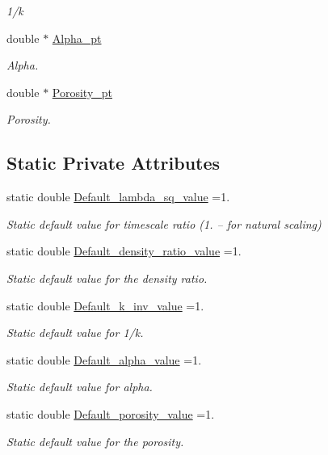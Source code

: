 \begin{DoxyCompactItemize}
\begin{DoxyCompactList}\small\item\em 1/k \end{DoxyCompactList}\item 
double $\ast$ \hyperlink{classoomph_1_1PoroelasticityEquations_a54c041adaebdbbf30e16becf2540edbe}{Alpha\+\_\+pt}
\begin{DoxyCompactList}\small\item\em Alpha. \end{DoxyCompactList}\item 
double $\ast$ \hyperlink{classoomph_1_1PoroelasticityEquations_a247e7383f1a5e52750c6c66ca15f45ce}{Porosity\+\_\+pt}
\begin{DoxyCompactList}\small\item\em Porosity. \end{DoxyCompactList}\end{DoxyCompactItemize}
\subsection*{Static Private Attributes}
\begin{DoxyCompactItemize}
\item 
static double \hyperlink{classoomph_1_1PoroelasticityEquations_a932d4122e3719a1aff4e45e186c48001}{Default\+\_\+lambda\+\_\+sq\+\_\+value} =1.
\begin{DoxyCompactList}\small\item\em Static default value for timescale ratio (1. -- for natural scaling) \end{DoxyCompactList}\item 
static double \hyperlink{classoomph_1_1PoroelasticityEquations_a49c8a61f86e8214878639c5e6c3deb59}{Default\+\_\+density\+\_\+ratio\+\_\+value} =1.
\begin{DoxyCompactList}\small\item\em Static default value for the density ratio. \end{DoxyCompactList}\item 
static double \hyperlink{classoomph_1_1PoroelasticityEquations_ac44640ce8b8d6bde48c236edb2f4301a}{Default\+\_\+k\+\_\+inv\+\_\+value} =1.
\begin{DoxyCompactList}\small\item\em Static default value for 1/k. \end{DoxyCompactList}\item 
static double \hyperlink{classoomph_1_1PoroelasticityEquations_a965748b26ceb0e5b2277b38eceb00444}{Default\+\_\+alpha\+\_\+value} =1.
\begin{DoxyCompactList}\small\item\em Static default value for alpha. \end{DoxyCompactList}\item 
static double \hyperlink{classoomph_1_1PoroelasticityEquations_a2bcb2ecdcde79ff04f6abb6c45d9da97}{Default\+\_\+porosity\+\_\+value} =1.
\begin{DoxyCompactList}\small\item\em Static default value for the porosity. \end{DoxyCompactList}\end{DoxyCompactItemize}
